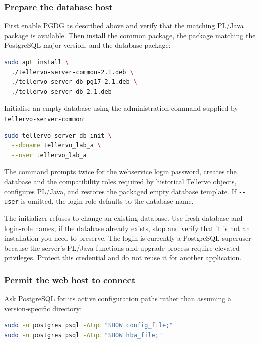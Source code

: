 \subsubsection{Prepare the database host}

First enable PGDG as described above and verify that the matching PL/Java
package is available. Then install the common package, the package matching the
PostgreSQL major version, and the database package:

\begin{lstlisting}[language=bash]
sudo apt install \
  ./tellervo-server-common-2.1.deb \
  ./tellervo-server-db-pg17-2.1.deb \
  ./tellervo-server-db-2.1.deb
\end{lstlisting}

Initialise an empty database using the administration command supplied by
\verb|tellervo-server-common|:

\begin{lstlisting}[language=bash]
sudo tellervo-server-db init \
  --dbname tellervo_lab_a \
  --user tellervo_lab_a
\end{lstlisting}

The command prompts twice for the webservice login password, creates the
database and the compatibility roles required by historical Tellervo objects,
configures PL/Java, and restores the packaged empty database template. If
\verb|--user| is omitted, the login role defaults to the database name.

The initializer refuses to change an existing database. Use fresh database and
login-role names; if the database already exists, stop and verify that it is
not an installation you need to preserve. The login is currently a PostgreSQL
superuser because the server's PL/Java functions and upgrade process require
elevated privileges. Protect this credential and do not reuse it for another
application.

\subsubsection{Permit the web host to connect}

Ask PostgreSQL for its active configuration paths rather than assuming a
version-specific directory:

\begin{lstlisting}[language=bash]
sudo -u postgres psql -Atqc "SHOW config_file;"
sudo -u postgres psql -Atqc "SHOW hba_file;"
\end{lstlisting}

